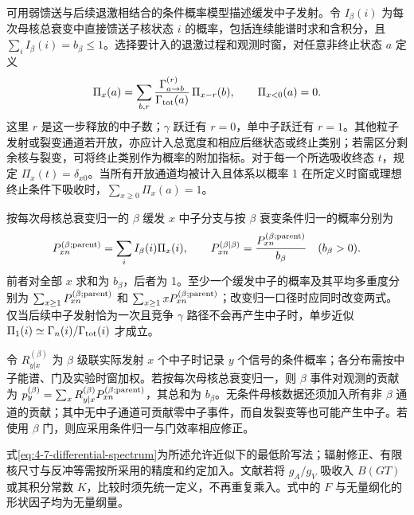 
可用弱馈送与后续退激相结合的条件概率模型描述缓发中子发射。令 $I_\beta(i)$ 为每次母核总衰变中直接馈送子核状态 $i$ 的概率，包括连续能谱时求和含积分，且 $\sum_i I_\beta(i)=b_\beta\leq1$。选择要计入的退激过程和观测时窗，对任意非终止状态 $a$ 定义
\begin{equation}\label{eq:4-7-cascade-pi-def}
\Pi_x(a)=\sum_{b,r}\frac{\Gamma^{(r)}_{a\to b}}{\Gamma_{\rm tot}(a)}\,\Pi_{x-r}(b),\qquad \Pi_{x<0}(a)=0.
\end{equation}
这里 $r$ 是这一步释放的中子数；$\gamma$ 跃迁有 $r=0$，单中子跃迁有 $r=1$。其他粒子发射或裂变通道若开放，亦应计入总宽度和相应后继状态或终止类别；若需区分剩余核与裂变，可将终止类别作为概率的附加指标。对于每一个所选吸收终态 $t$，规定 $\Pi_x(t)=\delta_{x0}$。当所有开放通道均被计入且体系以概率 1 在所定义时窗或理想终止条件下吸收时，$\sum_{x\ge0}\Pi_x(a)=1$。

按每次母核总衰变归一的 $\beta$ 缓发 $x$ 中子分支与按 $\beta$ 衰变条件归一的概率分别为
\begin{equation}\label{eq:4-7-conditional-probability}
P_{xn}^{(\beta;{\rm parent})}=\sum_i I_\beta(i)\Pi_x(i),\qquad
P_{xn}^{(\beta\mid\beta)}=\frac{P_{xn}^{(\beta;{\rm parent})}}{b_\beta}\quad(b_\beta>0).
\end{equation}
前者对全部 $x$ 求和为 $b_\beta$，后者为 1。至少一个缓发中子的概率及其平均多重度分别为 $\sum_{x\ge1}P_{xn}^{(\beta;{\rm parent})}$ 和 $\sum_{x\ge1}xP_{xn}^{(\beta;{\rm parent})}$；改变归一口径时应同时改变两式。仅当后续中子发射恰为一次且竞争 $\gamma$ 路径不会再产生中子时，单步近似 $\Pi_1(i)\simeq\Gamma_n(i)/\Gamma_{\rm tot}(i)$ 才成立。

令 $R_{y|x}^{(\beta)}$ 为 $\beta$ 级联实际发射 $x$ 个中子时记录 $y$ 个信号的条件概率；各分布需按中子能谱、门及实验时窗加权。若按每次母核总衰变归一，则 $\beta$ 事件对观测的贡献为 $p_y^{(\beta)}=\sum_x R_{y|x}^{(\beta)}P_{xn}^{(\beta;{\rm parent})}$，其总和为 $b_\beta$。无条件母核数据还须加入所有非 $\beta$ 通道的贡献；其中无中子通道可贡献零中子事件，而自发裂变等也可能产生中子。若使用 $\beta$ 门，则应采用条件归一与门效率相应修正。

式\eqref{eq:4-7-differential-spectrum}为所述允许近似下的最低阶写法；辐射修正、有限核尺寸与反冲等需按所采用的精度和约定加入。文献若将 $g_A/g_V$ 吸收入 $B(GT)$ 或其积分常数 $K$，比较时须先统一定义，不再重复乘入。式中的 $F$ 与无量纲化的形状因子均为无量纲量。

